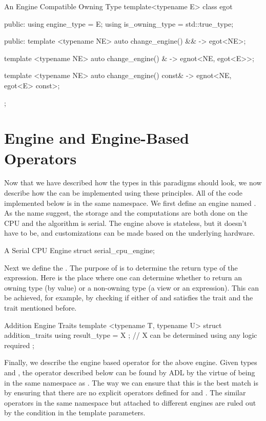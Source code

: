 \documentclass[oneside,11pt,a4paper]{jbarticle}
\begin{document}
\begin{codecpp}{An Engine Compatible Owning Type}
  template<typename E>
  class egot {
  public:
    using engine_type = E;
    using is_owning_type = std::true_type;

  public:
    template <typename NE>
    auto change_engine() && -> egot<NE>;

    template <typename NE>
    auto change_engine() & -> egnot<NE, egot<E>>;

    template <typename NE>
    auto change_engine() const& -> egnot<NE, egot<E> const>;
  };
\end{codecpp}

\section{Engine and Engine-Based Operators}

Now that we have described how the types in this paradigms should look, we now
describe how the  can be implemented using these
principles. All of the code implemented below is in the same namespace.  We
first define an engine named . As the name
suggest, the storage and the computations are both done on the CPU and the
algorithm is serial.  The engine above is stateless, but it doesn't have to be,
and customizations can be made based on the underlying hardware.

\begin{codecpp}{A Serial CPU Engine}
  struct serial_cpu_engine{};
\end{codecpp}

Next we define the . The purpose of
 is to determine the return type of the expression.
Here is the place where one can determine whether to return an owning type (by
value) or a non-owning type (a view or an expression). This can be achieved, for
example, by checking if either of  and  satisfies
the  trait and the
 trait mentioned before.

\begin{codecpp}{Addition Engine Traits}
template <typename T, typename U>
struct addition_traits {
  using result_type = X ; // X can be determined using any logic required
};
\end{codecpp}

Finally, we describe the engine based operator for the above engine. Given types
 and , the operator described below can be found by
ADL by the virtue of being in the same namespace as
. The way we can ensure that this is the best
match is by ensuring that there are no explicit operators defined for
 and . The similar operators in the same  namespace
but attached to different engines are ruled out by the condition in the template
parameters.
\end{document}
